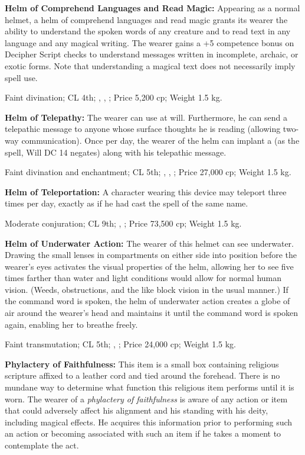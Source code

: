 \textbf{Helm of Comprehend Languages and Read Magic:} Appearing as a normal helmet, a helm of comprehend languages and read magic grants its wearer the ability to understand the spoken words of any creature and to read text in any language and any magical writing. The wearer gains a +5 competence bonus on Decipher Script checks to understand messages written in incomplete, archaic, or exotic forms. Note that understanding a magical text does not necessarily imply spell use.

Faint divination; CL 4th; , , ; Price 5,200 cp; Weight 1.5 kg.


\textbf{Helm of Telepathy:} The wearer can use  at will. Furthermore, he can send a telepathic message to anyone whose surface thoughts he is reading (allowing two-way communication). Once per day, the wearer of the helm can implant a  (as the spell, Will DC 14 negates) along with his telepathic message.

Faint divination and enchantment; CL 5th; , , ; Price 27,000 cp; Weight 1.5 kg.


\textbf{Helm of Teleportation:} A character wearing this device may teleport three times per day, exactly as if he had cast the spell of the same name.

Moderate conjuration; CL 9th; , ; Price 73,500 cp; Weight 1.5 kg.


\textbf{Helm of Underwater Action:} The wearer of this helmet can see underwater. Drawing the small lenses in compartments on either side into position before the wearer's eyes activates the visual properties of the helm, allowing her to see five times farther than water and light conditions would allow for normal human vision. (Weeds, obstructions, and the like block vision in the usual manner.) If the command word is spoken, the helm of underwater action creates a globe of air around the wearer's head and maintains it until the command word is spoken again, enabling her to breathe freely.

Faint transmutation; CL 5th; , ; Price 24,000 cp; Weight 1.5 kg.


\textbf{Phylactery of Faithfulness:} This item is a small box containing religious scripture affixed to a leather cord and tied around the forehead. There is no mundane way to determine what function this religious item performs until it is worn. The wearer of a \emph{phylactery of faithfulness} is aware of any action or item that could adversely affect his alignment and his standing with his deity, including magical effects. He acquires this information prior to performing such an action or becoming associated with such an item if he takes a moment to contemplate the act.

